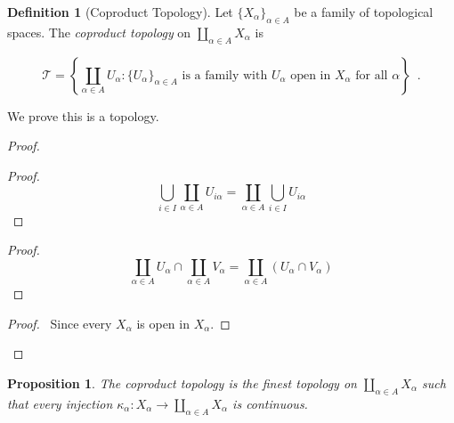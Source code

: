 \documentclass{book}
\let\qed\relax
\newtheorem{prop}[ax]{Proposition}
\theoremstyle{definition}
\newtheorem{df}[ax]{Definition}
\begin{document}
\begin{df}[Coproduct Topology]
Let $\{ X_\alpha \}_{\alpha \in A}$ be a family of topological spaces. The \emph{coproduct topology} on $\coprod_{\alpha \in A} X_\alpha$ is 

\[ \mathcal{T} = \left\{ \coprod_{\alpha \in A} U_\alpha : \{ U_\alpha \}_{\alpha \in A} \text{ is a family with $U_\alpha$ open in $X_\alpha$ for all $\alpha$} \right\} \enspace . \]

We prove this is a topology.
\end{df}

\begin{proof}
\pf
{}
\begin{proof}
	\pf
	\[ \bigcup_{i \in I} \coprod_{\alpha \in A} U_{i\alpha} = \coprod_{\alpha \in A} \bigcup_{i \in I} U_{i \alpha} \]
\end{proof}
\begin{proof}
	\pf
	\[ \coprod_{\alpha \in A} U_\alpha \cap \coprod_{\alpha \in A} V_\alpha = \coprod_{\alpha \in A} (U_\alpha \cap V_\alpha) \]
\end{proof}
\begin{proof}
	\pf\ Since every $X_\alpha$ is open in $X_\alpha$.
\end{proof}
\qed
\end{proof}

\begin{prop}
\label{prop:coproduct_finest}
The coproduct topology is the finest topology on $\coprod_{\alpha \in A} X_\alpha$ such that every injection $\kappa_\alpha : X_\alpha \rightarrow \coprod_{\alpha \in A} X_\alpha$ is continuous.
\end{prop}
\end{document}
